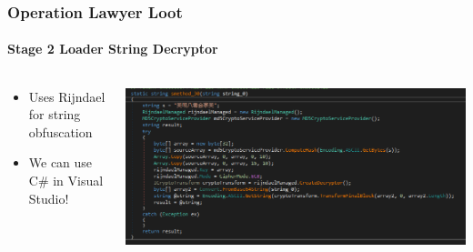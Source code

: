\documentclass[aspectratio=169]{beamer}
\begin{document}
{
\begin{frame}
  \frametitle{Operation Lawyer Loot}
  \framesubtitle{Stage 2 Loader String Decryptor}
  \begin{columns}
    \begin{column}{.3\textwidth}
      \begin{itemize}
      \item{Uses Rijndael for string obfuscation}
      \item{We can use C\# in Visual Studio!}
      \end{itemize}
    \end{column}
    \hfill
    \begin{column}{.7\textwidth}
      \begin{center}
        \includegraphics[scale=1.30]{kpot-unpacking-5}
      \end{center}
    \end{column}
  \end{columns}
\end{frame}
}
\end{document}
